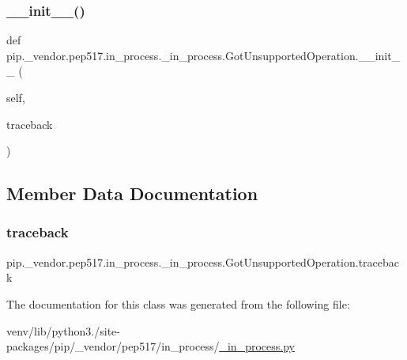 \subsubsection{\texorpdfstring{\+\_\+\+\_\+init\+\_\+\+\_\+()}{\_\_init\_\_()}}
{\footnotesize\ttfamily def pip.\+\_\+vendor.\+pep517.\+in\+\_\+process.\+\_\+in\+\_\+process.\+Got\+Unsupported\+Operation.\+\_\+\+\_\+init\+\_\+\+\_\+ (\begin{DoxyParamCaption}\item[{}]{self,  }\item[{}]{traceback }\end{DoxyParamCaption})}



\subsection{Member Data Documentation}
\mbox{\label{classpip_1_1__vendor_1_1pep517_1_1in__process_1_1__in__process_1_1GotUnsupportedOperation_a119665accd5b351c927c957d2ebecf43}} 
\subsubsection{\texorpdfstring{traceback}{traceback}}
{\footnotesize\ttfamily pip.\+\_\+vendor.\+pep517.\+in\+\_\+process.\+\_\+in\+\_\+process.\+Got\+Unsupported\+Operation.\+traceback}



The documentation for this class was generated from the following file\+:\begin{DoxyCompactItemize}
\item 
venv/lib/python3./site-\/packages/pip/\+\_\+vendor/pep517/in\+\_\+process/\hyperlink{__in__process_8py}{\+\_\+in\+\_\+process.\+py}\end{DoxyCompactItemize}
